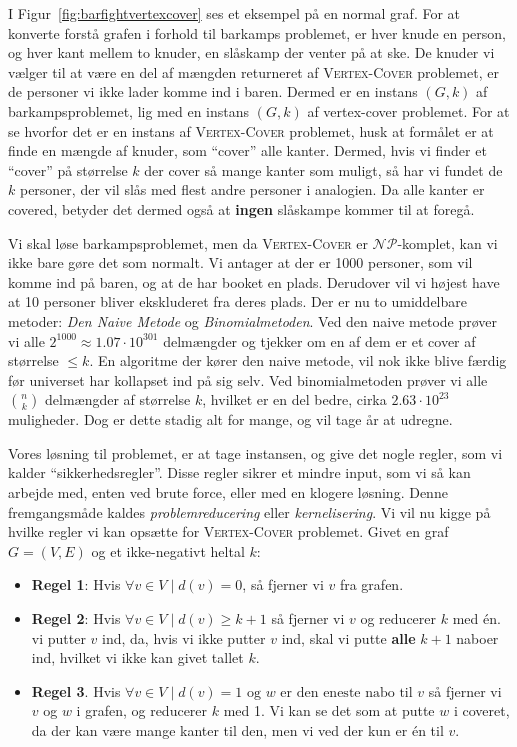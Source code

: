I Figur~\ref{fig:barfightvertexcover} ses et eksempel på en normal graf. For at konverte forstå grafen i forhold til barkamps problemet, er hver knude en person, og hver kant mellem to knuder, en slåskamp der venter på at ske. De knuder vi vælger til at være en del af mængden returneret af \textsc{Vertex-Cover} problemet, er de personer vi ikke lader komme ind i baren. Dermed er en instans $(G, k)$ af barkampsproblemet, lig med en instans $(G,k)$ af vertex-cover problemet. For at se hvorfor det er en instans af \textsc{Vertex-Cover} problemet, husk at formålet er at finde en mængde af knuder, som ``cover'' alle kanter. Dermed, hvis vi finder et ``cover'' på størrelse $k$ der cover så mange kanter som muligt, så har vi fundet de $k$ personer, der vil slås med flest andre personer i analogien. Da alle kanter er covered, betyder det dermed også at \textbf{ingen} slåskampe kommer til at foregå.

Vi skal løse barkampsproblemet, men da \textsc{Vertex-Cover} er $\mathcal{NP}$-komplet, kan vi ikke bare gøre det som normalt. Vi antager at der er 1000 personer, som vil komme ind på baren, og at de har booket en plads. Derudover vil vi højest have at 10 personer bliver ekskluderet fra deres plads. Der er nu to umiddelbare metoder: \textit{Den Naive Metode} og \textit{Binomialmetoden}. Ved den naive metode prøver vi alle $2^{1000} \approx 1.07 \cdot 10^{301}$ delmængder og tjekker om en af dem er et cover af størrelse $\le k$. En algoritme der kører den naive metode, vil nok ikke blive færdig før universet har kollapset ind på sig selv. Ved binomialmetoden prøver vi alle $\binom{n}{k}$ delmængder af størrelse $k$, hvilket er en del bedre, cirka $2.63 \cdot 10^{23}$ muligheder. Dog er dette stadig alt for mange, og vil tage år at udregne.

Vores løsning til problemet, er at tage instansen, og give det nogle regler, som vi kalder ``sikkerhedsregler''. Disse regler sikrer et mindre input, som vi så kan arbejde med, enten ved brute force, eller med en klogere løsning. Denne fremgangsmåde kaldes \textit{problemreducering} eller \textit{kernelisering}. Vi vil nu kigge på hvilke regler vi kan opsætte for \textsc{Vertex-Cover} problemet. Givet en graf $G = (V,E)$ og et ikke-negativt heltal $k$:
\begin{itemize}
	\item \textbf{Regel 1}: Hvis $\forall v \in V \mid d(v) = 0$, så fjerner vi $v$ fra grafen.
	\item \textbf{Regel 2}: Hvis $\forall v \in V \mid d(v) \ge k + 1$ så fjerner vi $v$ og reducerer $k$ med én. vi putter $v$ ind, da, hvis vi ikke putter $v$ ind, skal vi putte \textbf{alle} $k+1$ naboer ind, hvilket vi ikke kan givet tallet $k$.
	\item \textbf{Regel 3}. Hvis $\forall v \in V \mid d(v) = 1 \text{ og } w \text{ er den eneste nabo til }v$   så fjerner vi $v$ og $w$ i grafen, og reducerer $k$ med 1. Vi kan se det som at putte $w$ i coveret, da der kan være mange kanter til den, men vi ved der kun er én til $v$.
\end{itemize}

